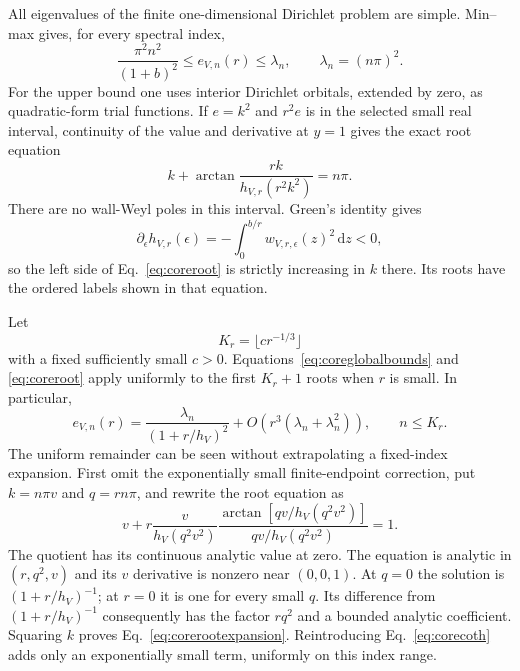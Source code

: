 \documentclass[aps,pra,reprint,superscriptaddress,longbibliography]{revtex4-2}
\newcommand{\dd}{\mathrm d}
\begin{document}
All eigenvalues of the finite one-dimensional Dirichlet problem are simple.
Min--max gives, for every spectral index,
\begin{equation}
 \frac{\pi^2n^2}{(1+b)^2}\le e_{V,n}(r)\le\lambda_n,
 \qquad \lambda_n=(n\pi)^2.
 \label{eq:coreglobalbounds}
\end{equation}
For the upper bound one uses interior Dirichlet orbitals, extended by zero,
as quadratic-form trial functions. If $e=k^2$ and $r^2e$ is in the selected
small real interval, continuity of the value and derivative at $y=1$
gives the exact root equation
\begin{equation}
 k+\arctan\frac{rk}{h_{V,r}(r^2k^2)}=n\pi.
 \label{eq:coreroot}
\end{equation}
There are no wall-Weyl poles in this interval. Green's identity gives
\begin{equation}
 \partial_\epsilon h_{V,r}(\epsilon)
       =-\int_0^{b/r}w_{V,r,\epsilon}(z)^2\,\dd z<0,
 \label{eq:coreweylderivative}
\end{equation}
so the left side of Eq.~\eqref{eq:coreroot} is strictly increasing in $k$
there. Its roots have the ordered labels shown in that equation.

Let
\begin{equation}
 K_r=\lfloor c r^{-1/3}\rfloor
 \label{eq:corethermalcutoff}
\end{equation}
with a fixed sufficiently small $c>0$. Equations~\eqref{eq:coreglobalbounds}
and \eqref{eq:coreroot} apply uniformly to the first $K_r+1$ roots when
$r$ is small. In particular,
\begin{equation}
 e_{V,n}(r)=\frac{\lambda_n}{(1+r/h_V)^2}
            +O\!\left(r^3(\lambda_n+\lambda_n^2)\right),
 \qquad n\le K_r.
 \label{eq:corerootexpansion}
\end{equation}
The uniform remainder can be seen without extrapolating a fixed-index
expansion. First omit the exponentially small finite-endpoint correction,
put $k=n\pi v$ and $q=rn\pi$, and rewrite the root equation as
\begin{equation}
 v+r\frac{v}{h_V(q^2v^2)}
       \frac{\arctan[qv/h_V(q^2v^2)]}{qv/h_V(q^2v^2)}=1.
 \label{eq:coreanalyticroot}
\end{equation}
The quotient has its continuous analytic value at zero. The equation is
analytic in $(r,q^2,v)$ and its $v$ derivative is nonzero near $(0,0,1)$.
At $q=0$ the solution is $(1+r/h_V)^{-1}$; at $r=0$ it is one for every
small $q$. Its difference from $(1+r/h_V)^{-1}$ consequently has the
factor $rq^2$ and a bounded analytic coefficient. Squaring $k$ proves
Eq.~\eqref{eq:corerootexpansion}. Reintroducing
Eq.~\eqref{eq:corecoth} adds only an exponentially small term, uniformly
on this index range.
\end{document}
